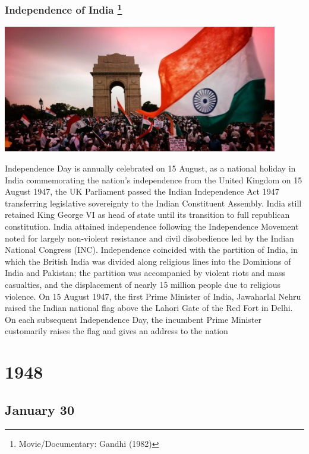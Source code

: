 \documentclass[11pt]{report}
\begin{document}
\subsection{Independence of India \protect\footnote{Movie/Documentary: Gandhi (1982)}}
\vspace{2mm}\begin{center}\includegraphics[width=12cm]{./img/independenceIndia.jpg}\end{center}
Independence Day is annually celebrated on 15 August, as a national holiday in India commemorating the nation's independence from the United Kingdom on 15 August 1947, the UK Parliament passed the Indian Independence Act 1947 transferring legislative sovereignty to the Indian Constituent Assembly. India still retained King George VI as head of state until its transition to full republican constitution. India attained independence following the Independence Movement noted for largely non-violent resistance and civil disobedience led by the Indian National Congress (INC). Independence coincided with the partition of India, in which the British India was divided along religious lines into the Dominions of India and Pakistan; the partition was accompanied by violent riots and mass casualties, and the displacement of nearly 15 million people due to religious violence. On 15 August 1947, the first Prime Minister of India, Jawaharlal Nehru raised the Indian national flag above the Lahori Gate of the Red Fort in Delhi. On each subsequent Independence Day, the incumbent Prime Minister customarily raises the flag and gives an address to the nation

\chapter{1948}
\section{January 30}
\end{document}
